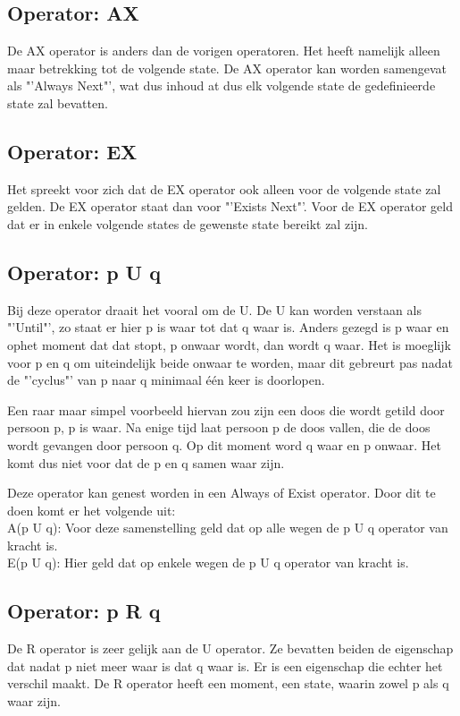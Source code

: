 \documentclass{article}%
\begin{document}
\subsection{Operator: AX}
De AX operator is anders dan de vorigen operatoren. Het heeft namelijk alleen maar betrekking tot de volgende state. De AX operator kan worden samengevat als "'Always Next"', wat dus inhoud at dus elk volgende state de gedefinieerde state zal bevatten.

\subsection{Operator: EX}
Het spreekt voor zich dat de EX operator ook alleen voor de volgende state zal gelden. De EX operator staat dan voor "'Exists Next"'. Voor de EX operator geld dat er in enkele volgende states de gewenste state bereikt zal zijn.

\subsection{Operator: p U q}
Bij deze operator draait het vooral om de U. De U kan worden verstaan als "'Until"', zo staat er hier p is waar tot dat q waar is. Anders gezegd is p waar en ophet moment dat dat stopt, p onwaar wordt, dan wordt q waar. Het is moeglijk voor p en q om uiteindelijk beide onwaar te worden, maar dit gebreurt pas nadat de "'cyclus"' van p naar q minimaal één keer is doorlopen.

Een raar maar simpel voorbeeld hiervan zou zijn een doos die wordt getild door persoon p, p is waar. Na enige tijd laat persoon p de doos vallen, die de doos wordt gevangen door persoon q. Op dit moment word q waar en p onwaar. Het komt dus niet voor dat de p en q samen waar zijn.

Deze operator kan genest worden in een Always of Exist operator. Door dit te doen komt er het volgende uit:
\\
A(p U q): Voor deze samenstelling geld dat op alle wegen de p U q operator van kracht is.
\\
E(p U q): Hier geld dat op enkele wegen de p U q operator van kracht is.

\subsection{Operator: p R q}
De R operator is zeer gelijk aan de U operator. Ze bevatten beiden de eigenschap dat nadat p niet meer waar is dat q waar is. Er is een eigenschap die echter het verschil maakt. De R operator heeft een moment, een state, waarin zowel p als q waar zijn.
\end{document}
